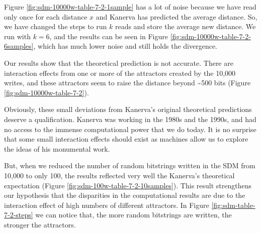 Figure \ref{fig:sdm-10000w-table-7-2-1sample} has a lot of noise because we have read only once for each distance $x$ and Kanerva has predicted the average distance. So, we have changed the steps to run $k$ reads and store the average new distance. We run with $k=6$, and the results can be seen in Figure \ref{fig:sdm-10000w-table-7-2-6samples}, which has much lower noise and still holds the divergence.

Our results show that the theoretical prediction is not accurate.  There are interaction effects from one or more of the attractors created by the 10,000 writes, and these attractors seem to raise the distance beyond \textasciitilde 500 bits (Figure \ref{fig:sdm-10000w-table-7-2}).

Obviously, these small deviations from Kanerva's original theoretical predictions deserve a qualification.  Kanerva was working in the 1980s and the 1990s, and had no access to the immense computational power that we do today. It is no surprise that some small interaction effects should exist as machines allow us to explore the ideas of his monumental work.

But, when we reduced the number of random bitstrings written in the SDM from 10,000 to only 100, the results reflected very well the Kanerva's theoretical expectation (Figure \ref{fig:sdm-100w-table-7-2-10samples}). This result strengthens our hypothesis that the disparities in the computational results are due to the interaction effect of high numbers of different attractors. In Figure \ref{fig:sdm-table-7-2-steps} we can notice that, the more random bitstrings are written, the stronger the attractors.

